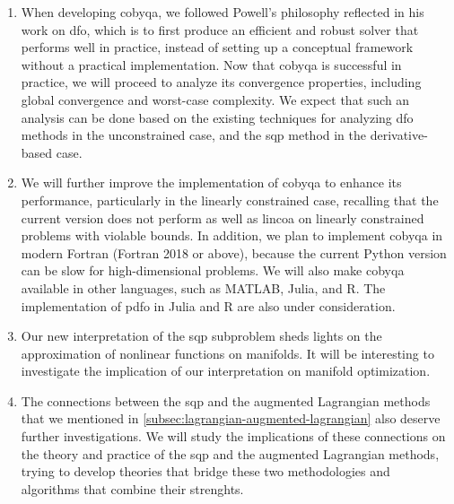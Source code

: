 \begin{enumerate}
    \item When developing \gls{cobyqa}, we followed Powell's philosophy reflected in his work on \gls{dfo}, which is to first produce an efficient and robust solver that performs well in practice, instead of setting up a conceptual framework without a practical implementation.
    Now that \gls{cobyqa} is successful in practice, we will proceed to analyze its convergence properties, including global convergence and worst-case complexity.
    We expect that such an analysis can be done based on the existing techniques for analyzing \gls{dfo} methods in the unconstrained case, and the \gls{sqp} method in the derivative-based case.
    \item We will further improve the implementation of \gls{cobyqa} to enhance its performance, particularly in the linearly constrained case, recalling that the current version does not perform as well as \gls{lincoa} on linearly constrained problems with violable bounds.
    In addition, we plan to implement \gls{cobyqa} in modern Fortran (Fortran 2018 or above), because the current Python version can be slow for high-dimensional problems.
    We will also make \gls{cobyqa} available in other languages, such as MATLAB, Julia, and R.
    The implementation of \gls{pdfo} in Julia and R are also under consideration.
    \item Our new interpretation of the \gls{sqp} subproblem sheds lights on the approximation of nonlinear functions on manifolds.
    It will be interesting to investigate the implication of our interpretation on manifold optimization.
    \item The connections between the \gls{sqp} and the augmented Lagrangian methods that we mentioned in \cref{subsec:lagrangian-augmented-lagrangian} also deserve further investigations.
    We will study the implications of these connections on the theory and practice of the \gls{sqp} and the augmented Lagrangian methods, trying to develop theories that bridge these two methodologies and algorithms that combine their strenghts.

\end{enumerate}
